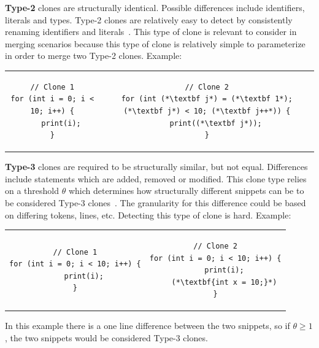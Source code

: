 \textbf{Type-2} clones are structurally identical. Possible differences include
identifiers, literals and types. Type-2 clones are relatively easy to detect by
consistently renaming identifiers and literals~\cite[2]{Zibran_real_time_search}. This
type of clone is relevant to consider in merging scenarios because this type
of clone is relatively simple to parameterize in order to merge two Type-2 clones.
Example:


\begin{center}
	\begin{tcolorbox}
		\begin{tabular}{c | c}
			\begin{lstlisting}
// Clone 1
for (int i = 0; i < 10; i++) {
    print(i);
}
    \end{lstlisting} &
			\begin{lstlisting}
// Clone 2
for (int (*\textbf j*) = (*\textbf 1*); (*\textbf j*) < 10; (*\textbf j++*)) {
    print((*\textbf j*));
}
    \end{lstlisting}
		\end{tabular}
	\end{tcolorbox}
\end{center}

\textbf{Type-3} clones are required to be structurally similar, but not equal. Differences
include statements which are added, removed or modified. This clone type relies on a
threshold $\theta$ which determines how structurally different snippets can be to be
considered Type-3 clones~\cite{Inoue_introduction_to_cc}. The granularity for this
difference could be based on differing tokens, lines, etc. Detecting this type of clone is
hard. Example:

\begin{tcolorbox}
	\begin{center}
		\begin{tabular}{c | c}
			\begin{lstlisting}
// Clone 1
for (int i = 0; i < 10; i++) {
    print(i);
}
\end{lstlisting} &
			\begin{lstlisting}
// Clone 2
for (int i = 0; i < 10; i++) {
    print(i);
    (*\textbf{int x = 10;}*)
}
\end{lstlisting}
		\end{tabular}
	\end{center}
\end{tcolorbox}




In this example there is a one line difference between the two snippets, so if $\theta
	\geq
	1$, the two snippets would be considered Type-3 clones.


